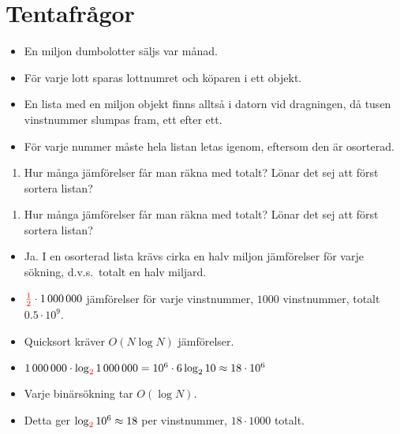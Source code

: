 \mode*

\section{Tentafrågor}

\begin{frame}
  \begin{exercise}
    \begin{itemize}
      \item En miljon dumbolotter säljs var månad.
      \item För varje lott sparas lottnumret och köparen i ett objekt.
      \item En lista med en miljon objekt finns alltså i datorn vid dragningen, 
        då tusen vinstnummer slumpas fram, ett efter ett.
      \item För varje nummer måste hela listan letas igenom, eftersom den är 
        osorterad.
    \end{itemize}
    \begin{enumerate}
      \item Hur många jämförelser får man räkna med totalt? Lönar det sej att 
        först sortera listan?
    \end{enumerate}
  \end{exercise}
\end{frame}

\begin{frame}
  \begin{exercise}
    \begin{enumerate}
      \item Hur många jämförelser får man räkna med totalt? Lönar det sej att 
        först sortera listan?
    \end{enumerate}
  \end{exercise}

  \begin{solution}
    \begin{itemize}
      \item Ja. I en osorterad lista krävs cirka en halv miljon jämförelser för 
        varje sökning, d.v.s.\ totalt en halv miljard.
      \item \({\color{red}\frac{1}{2}}\cdot 1\,000\,000\) jämförelser för varje 
        vinstnummer, \(1000\) vinstnummer, totalt \(0.5\cdot 10^{9}\).
      \item Quicksort kräver \(O(N\log N)\) jämförelser.
      \item \(1\,000\,000\cdot \log_{\color{red}2} 1\,000\,000 = 10^6\cdot 
        6\log_2 
            10 \approx 18\cdot 10^6\)
      \item Varje binärsökning tar \(O(\log N)\).
      \item Detta ger \(\log_{\color{red}2} 10^6\approx 18\) per vinstnummer, 
        \(18\cdot 1000\) totalt.
    \end{itemize}
  \end{solution}
\end{frame}


